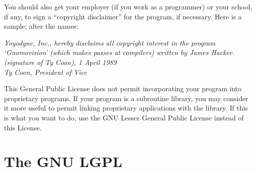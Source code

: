 {You should also get your employer (if you work as a programmer) or your
school, if any, to sign a ``copyright disclaimer'' for the program, if
necessary.  Here is a sample; alter the names:

\medskip
{\itshape\noindent Yoyodyne, Inc., hereby disclaims all copyright interest in
the program `Gnomovision' (which makes passes at compilers) written by James
Hacker.\\
\noindent (signature of Ty Coon), 1 April 1989\\
\noindent Ty Coon, President of Vice}
\medskip

This General Public License does not permit incorporating your program
into proprietary programs.  If your program is a subroutine library, you
may consider it more useful to permit linking proprietary applications
with the library.  If this is what you want to do, use the GNU Lesser
General Public License instead of this License.

} %

\chapter[The GNU Lesser General Public License]{The GNU LGPL}\label{appendix:lgpl}

